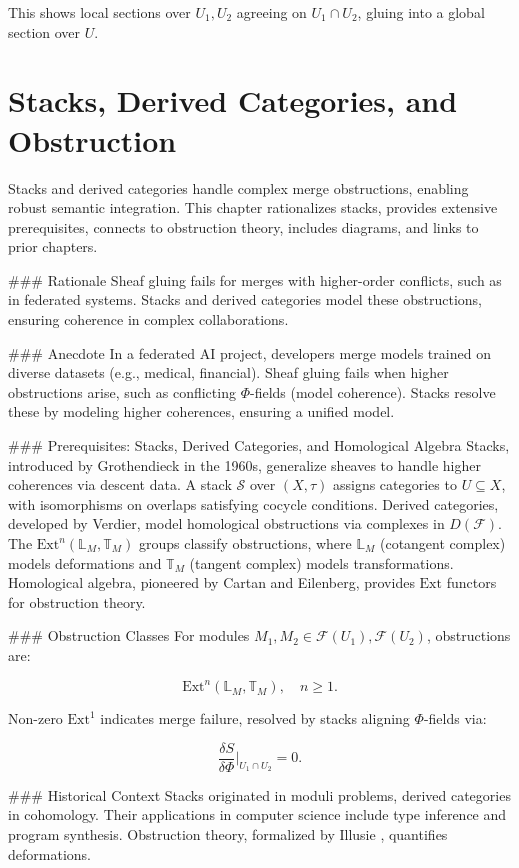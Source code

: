 \documentclass[12pt]{article}
\begin{document}
{This shows local sections over $U_1, U_2$ agreeing on $U_1 \cap U_2$, gluing into a global section over $U$.

\section{Stacks, Derived Categories, and Obstruction}
\label{sec:chapter5}

Stacks and derived categories handle complex merge obstructions, enabling robust semantic integration. This chapter rationalizes stacks, provides extensive prerequisites, connects to obstruction theory, includes diagrams, and links to prior chapters.

### Rationale
Sheaf gluing fails for merges with higher-order conflicts, such as in federated systems. Stacks and derived categories model these obstructions, ensuring coherence in complex collaborations.

### Anecdote
In a federated AI project, developers merge models trained on diverse datasets (e.g., medical, financial). Sheaf gluing fails when higher obstructions arise, such as conflicting $\Phi$-fields (model coherence). Stacks resolve these by modeling higher coherences, ensuring a unified model.

### Prerequisites: Stacks, Derived Categories, and Homological Algebra
Stacks, introduced by Grothendieck in the 1960s, generalize sheaves to handle higher coherences via descent data. A stack $\mathcal{S}$ over $(X, \tau)$ assigns categories to $U \subseteq X$, with isomorphisms on overlaps satisfying cocycle conditions. Derived categories, developed by Verdier, model homological obstructions via complexes in $D(\mathcal{F})$. The $\mathrm{Ext}^n(\mathbb{L}_M, \mathbb{T}_M)$ groups classify obstructions, where $\mathbb{L}_M$ (cotangent complex) models deformations and $\mathbb{T}_M$ (tangent complex) models transformations. Homological algebra, pioneered by Cartan and Eilenberg, provides $\mathrm{Ext}$ functors for obstruction theory.

### Obstruction Classes
For modules $M_1, M_2 \in \mathcal{F}(U_1), \mathcal{F}(U_2)$, obstructions are:

\[
\mathrm{Ext}^n(\mathbb{L}_M, \mathbb{T}_M), \quad n \geq 1.
\]

Non-zero $\mathrm{Ext}^1$ indicates merge failure, resolved by stacks aligning $\Phi$-fields via:

\[
\frac{\delta S}{\delta \Phi}|_{U_1 \cap U_2} = 0.
\]

### Historical Context
Stacks originated in moduli problems, derived categories in cohomology. Their applications in computer science include type inference and program synthesis. Obstruction theory, formalized by Illusie \cite{illusie1971complexe}, quantifies deformations.

}
\end{document}
